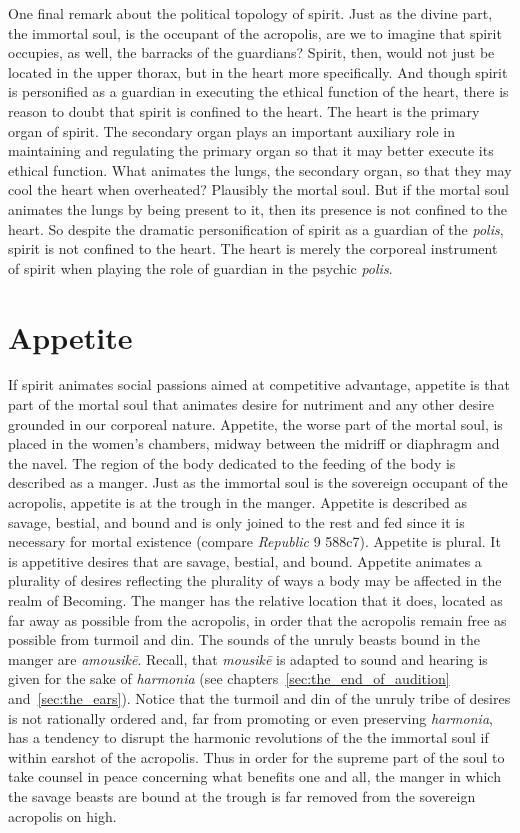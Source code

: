 One final remark about the political topology of spirit. Just as the divine part, the immortal soul, is the occupant of the acropolis, are we to imagine that spirit occupies, as well, the barracks of the guardians? Spirit, then, would not just be located in the upper thorax, but in the heart more specifically. And though spirit is personified as a guardian in executing the ethical function of the heart, there is reason to doubt that spirit is confined to the heart. The heart is the primary organ of spirit. The secondary organ plays an important auxiliary role in maintaining and regulating the primary organ so that it may better execute its ethical function. What animates the lungs, the secondary organ, so that they may cool the heart when overheated? Plausibly the mortal soul. But if the mortal soul animates the lungs by being present to it, then its presence is not confined to the heart. So despite the dramatic personification of spirit as a guardian of the \emph{polis}, spirit is not confined to the heart. The heart is merely the corporeal instrument of spirit when playing the role of guardian in the psychic \emph{polis}.


\section{Appetite} %
\label{sec:appetite}

If spirit animates social passions aimed at competitive advantage, appetite is that part of the mortal soul that animates desire for nutriment and any other desire grounded in our corporeal nature. Appetite, the worse part of the mortal soul, is placed in the women's chambers, midway between the midriff or diaphragm and the navel. The region of the body dedicated to the feeding of the body is described as a manger. Just as the immortal soul is the sovereign occupant of the acropolis, appetite is at the trough in the manger. Appetite is described as savage, bestial, and bound and is only joined to the rest and fed since it is necessary for mortal existence (compare \emph{Republic} 9 588c7). Appetite is plural. It is appetitive desires that are savage, bestial, and bound. Appetite animates a plurality of desires reflecting the plurality of ways a body may be affected in the realm of Becoming. The manger has the relative location that it does, located as far away as possible from the acropolis, in order that the acropolis remain free as possible from turmoil and din. The sounds of the unruly beasts bound in the manger are \emph{amousikē}. Recall, that \emph{mousikē} is adapted to sound and hearing is given for the sake of \emph{harmonia} (see chapters~\ref{sec:the_end_of_audition} and~\ref{sec:the_ears}). Notice that the turmoil and din of the unruly tribe of desires is not rationally ordered and, far from promoting or even preserving \emph{harmonia}, has a tendency to disrupt the harmonic revolutions of the the immortal soul if within earshot of the acropolis. Thus in order for the supreme part of the soul to take counsel in peace concerning what benefits one and all, the manger in which the savage beasts are bound at the trough is far removed from the sovereign acropolis on high.

